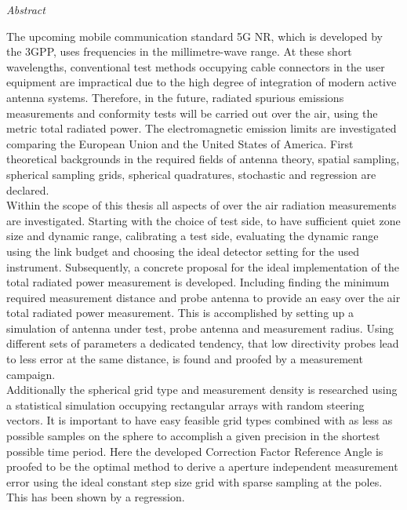 

\newpage
\thispagestyle{empty}
\begin{center}
\Huge\emph{Abstract}
\end{center}
\medskip
\noindent

The upcoming mobile communication standard 5G NR, which is developed by the 3GPP, uses frequencies in the millimetre-wave range.
At these short wavelengths, conventional test methods occupying cable connectors in the user equipment are impractical due to the high degree of integration of modern active antenna systems.
Therefore, in the future, radiated spurious emissions measurements and conformity tests will be carried out over the air, using the metric total radiated power.
The electromagnetic emission limits are investigated comparing the European Union and the United States of America.
First theoretical backgrounds in the required fields of antenna theory, spatial sampling, spherical sampling grids, spherical quadratures, stochastic and regression are declared.\\

Within the scope of this thesis all aspects of over the air radiation measurements are investigated.
Starting with the choice of test side, to have sufficient quiet zone size and dynamic range, calibrating a test side, evaluating the dynamic range using the link budget and choosing the ideal detector setting for the used instrument.
Subsequently, a concrete proposal for the ideal implementation of the total radiated power measurement is developed.
Including finding the minimum required measurement distance and probe antenna to provide an easy over the air total radiated power measurement.
This is accomplished by setting up a simulation of antenna under test, probe antenna and measurement radius.
Using different sets of parameters a dedicated tendency, that low directivity probes lead to less error at the same distance, is found and proofed by a measurement campaign.\\

Additionally the spherical grid type and measurement density is researched using a statistical simulation occupying rectangular arrays with random steering vectors.
It is important to have easy feasible grid types combined with as less as possible samples on the sphere to accomplish a given precision in the shortest possible time period.
Here the developed Correction Factor Reference Angle is proofed to be the optimal method to derive a aperture independent measurement error using the ideal constant step size grid with sparse sampling at the poles.
This has been shown by a regression.

